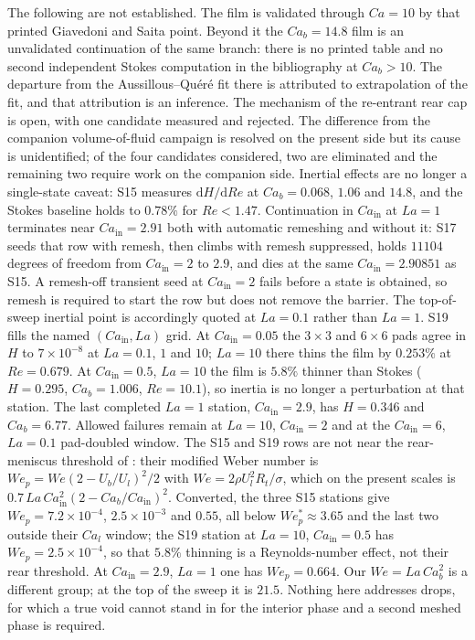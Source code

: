 \documentclass[11pt,a4paper]{article}
\begin{document}
The following are not established. The film is validated through $Ca=10$ by
that printed Giavedoni and Saita point. Beyond it the $Ca_b=14.8$ film is an
unvalidated continuation of the same branch: there is no printed table and no
second independent Stokes computation in the bibliography at $Ca_b>10$. The
departure from the Aussillous--Qu\'er\'e fit there is attributed to
extrapolation of the fit, and that attribution is an inference.
The mechanism of the re-entrant rear cap is open, with one candidate measured
and rejected. The difference from the companion volume-of-fluid campaign is
resolved on the present side but its cause is unidentified; of the four
candidates considered, two are eliminated and the remaining two require work on
the companion side. Inertial effects are no longer a single-state caveat: S15
measures $\mathrm{d}H/\mathrm{d}Re$ at $Ca_b=0.068$, $1.06$ and $14.8$, and
the Stokes baseline holds to $0.78\%$ for $Re<1.47$. Continuation in
$Ca_{\mathrm{in}}$ at $La=1$ terminates near $Ca_{\mathrm{in}}=2.91$ both
with automatic remeshing and without it: S17 seeds that row with remesh,
then climbs with remesh suppressed, holds $11104$ degrees of freedom from
$Ca_{\mathrm{in}}=2$ to $2.9$, and dies at the same $Ca_{\mathrm{in}}=2.90851$
as S15. A remesh-off transient seed at $Ca_{\mathrm{in}}=2$ fails before a
state is obtained, so remesh is required to start the row but does not
remove the barrier. The top-of-sweep inertial point is accordingly quoted
at $La=0.1$ rather than $La=1$. S19 fills the named
$(Ca_{\mathrm{in}},La)$ grid. At $Ca_{\mathrm{in}}=0.05$ the $3\times3$ and
$6\times6$ pads agree in $H$ to $7\times10^{-8}$ at $La=0.1$, $1$ and $10$;
$La=10$ there thins the film by $0.253\%$ at $Re=0.679$. At
$Ca_{\mathrm{in}}=0.5$, $La=10$ the film is $5.8\%$ thinner than Stokes
($H=0.295$, $Ca_b=1.006$, $Re=10.1$), so inertia is no longer a perturbation
at that station. The last completed $La=1$ station,
$Ca_{\mathrm{in}}=2.9$, has $H=0.346$ and $Ca_b=6.77$. Allowed failures
remain at $La=10$, $Ca_{\mathrm{in}}=2$ and at the $Ca_{\mathrm{in}}=6$,
$La=0.1$ pad-doubled window. The S15 and S19 rows are not near
the rear-meniscus threshold of \citet{magnini2025stability}: their modified
Weber number is $We_p=We(2-U_b/U_l)^2/2$ with $We=2\rho U_l^2 R_t/\sigma$,
which on the present scales is
$0.7\,La\,Ca_{\mathrm{in}}^2(2-Ca_b/Ca_{\mathrm{in}})^2$. Converted, the three
S15 stations give $We_p=7.2\times10^{-4}$, $2.5\times10^{-3}$ and $0.55$, all
below $We_p^*\approx3.65$ and the last two outside their $Ca_l$ window; the
S19 station at $La=10$, $Ca_{\mathrm{in}}=0.5$ has $We_p=2.5\times10^{-4}$,
so that $5.8\%$ thinning is a Reynolds-number effect, not their rear
threshold. At $Ca_{\mathrm{in}}=2.9$, $La=1$ one has $We_p=0.664$. Our
$We=La\,Ca_b^2$ is a different group; at the top of the sweep it is $21.5$.
Nothing here
addresses drops, for which a true void cannot stand in for the interior phase
and a second meshed phase is required.
\end{document}
